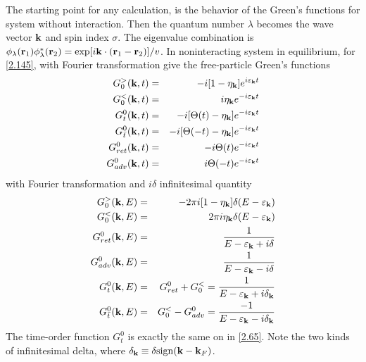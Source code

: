 The starting point for any calculation, is the behavior of the Green's functions for system without interaction.
Then the quantum number $\lambda$ becomes the wave vector $\mathbf{k}$ and spin index $\sigma$.
The eigenvalue combination is $\phi_\lambda(\mathbf{r}_1)\phi^*_\lambda(\mathbf{r}_2) = \exp[i\mathbf{k} \cdot (\mathbf{r}_1-\mathbf{r}_2)]/v$.
In noninteracting system in equilibrium, for \eqref{2.145}, with Fourier transformation give the free-particle Green's functions
\begin{eqnarray}
  G^>_0(\mathbf{k},t) &=& -i[1-\eta_{\mathbf{k}}] e^{i\varepsilon_{\mathbf{k}} t} \nonumber \\
  G^<_0(\mathbf{k},t) &=& i\eta_{\mathbf{k}} e^{-i\varepsilon_{\mathbf{k}} t} \nonumber \\
  G^0_t(\mathbf{k},t) &=& -i[\Theta(t) -\eta_{\mathbf{k}}] e^{-i \varepsilon_{\mathbf{k}} t} \nonumber \\
  G^0_{\bar{t}}(\mathbf{k},t) &=& -i [\Theta(-t)- \eta_{\mathbf{k}}] e^{-i\varepsilon_{\mathbf{k}} t} \nonumber \\
  G^0_{ret}(\mathbf{k},t) &=& -i \Theta(t) e^{-i\varepsilon_{\mathbf{k}} t} \nonumber \\
  G^0_{adv}(\mathbf{k},t) &=& i\Theta(-t) e^{-i\varepsilon_{\mathbf{k}} t} \label{2.148}
\end{eqnarray}
with Fourier transformation and $i\delta$ infinitesimal quantity
\begin{eqnarray}
  G^>_0(\mathbf{k},E) &=& -2\pi i [1-\eta_{\mathbf{k}}] \delta(E-\varepsilon_{\mathbf{k}}) \nonumber \\
  G^<_0(\mathbf{k},E) &=& 2\pi i \eta_{\mathbf{k}} \delta(E-\varepsilon_{\mathbf{k}}) \nonumber \\
  G_{ret}^0 (\mathbf{k},E) &=& \frac{1}{E-\varepsilon_{\mathbf{k}} + i \delta} \nonumber \\
  G_{adv}^0 (\mathbf{k},E) &=& \frac{1}{E- \varepsilon_{\mathbf{k}} - i \delta} \nonumber \\
  G_t^0 (\mathbf{k},E) &=& G_{ret}^0 + G^<_0 = \frac{1}{E-\varepsilon_{\mathbf{k}} + i \delta_{\mathbf{k}}} \nonumber \\
  G_{\bar{t}}^0 (\mathbf{k},E) &=& G^<_0 - G_{adv}^0 = \frac{-1}{E- \varepsilon_{\mathbf{k}} - i\delta_{\mathbf{k}}}  \label{2.149}
\end{eqnarray}
The time-order function $G^0_t$ is exactly the same on in \eqref{2.65}.
Note the two kinds of infinitesimal delta, where $\delta_{\mathbf{k}}\equiv \delta \mathrm{sign}(\mathbf{k}-\mathbf{k}_F)$.

